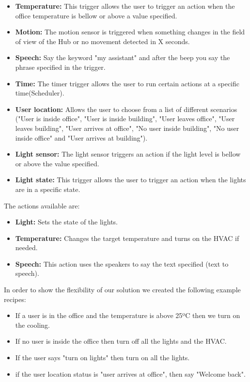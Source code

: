 \begin{itemize}
  \item \textbf{Temperature:} This trigger allows the user to trigger an action when the office temperature is bellow or above a value specified.
  \item \textbf{Motion:} The motion sensor is triggered when something changes in the field of view of the Hub or no movement detected in X seconds.
  \item \textbf{Speech:} Say the keyword "my assistant" and after the beep you say the phrase specified in the trigger.  
  \item \textbf{Time:} The timer trigger allows the user to run certain actions at a specific time(Scheduler).  
  \item \textbf{User location:} Allows the user to choose from a list of different scenarios ("User is inside office", "User is inside building", "User leaves office", "User leaves building", "User arrives at office", "No user inside building", "No user inside office" and "User arrives at building").
  \item \textbf{Light sensor:} The light sensor triggers an action if the light level is bellow or above the value specified.
  \item \textbf{Light state:} This trigger allows the user to trigger an action when the lights are in a specific state.
  
\end{itemize}

The actions available are:

\begin{itemize}
  \item \textbf{Light:} Sets the state of the lights.
  \item \textbf{Temperature:} Changes the target temperature and turns on the HVAC if needed.
  \item \textbf{Speech:} This action uses the speakers to say the text specified (text to speech).
\end{itemize}


In order to show the flexibility of our solution we created the following example recipes:
\begin{itemize}
  \item If a user is in the office and the temperature is above 25ºC then we turn on the cooling.
  \item If no user is inside the office then turn off all the lights and the HVAC.
  \item If the user says "turn on lights" then turn on all the lights.
  \item if the user location status is "user arrives at office", then say "Welcome back".
 
\end{itemize}



